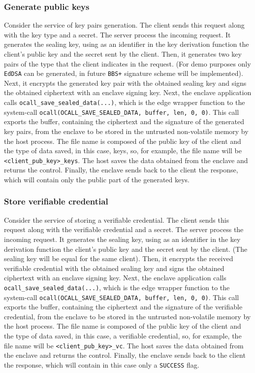 \subsubsection{Generate public keys}
Consider the service of key pairs generation. The client sends this request along with the key type and a secret. The server process the incoming request. It generates the sealing key, using as an identifier in the key derivation function the client's public key and the secret sent by the client. Then, it generates two key pairs of the type that the client indicates in the request. (For demo purposes only \texttt{EdDSA} can be generated, in future \texttt{BBS+} signature scheme will be implemented). 
Next, it encrypts the generated key pair with the obtained sealing key and signs the obtained ciphertext with an enclave signing key. Next, the enclave application calls \texttt{ocall\_save\_sealed\_data(...)}, which is the edge wrapper function to the system-call \texttt{ocall(OCALL\_SAVE\_SEALED\_DATA, buffer, len, 0, 0)}. This call exports the buffer, containing the ciphertext and the signature of the generated key pairs, from the enclave to be stored in the untrusted non-volatile memory by the host process. The file name is composed of the public key of the client and the type of data saved, in this case, keys, so, for example, the file name will be \texttt{<client\_pub\_key>\_keys}. The host saves the data obtained from the enclave and returns the control. 
Finally, the enclave sends back to the client the response, which will contain only the public part of the generated keys. 

\subsubsection{Store verifiable credential}
Consider the service of storing a verifiable credential. The client sends this request along with the verifiable credential and a secret. The server process the incoming request. It generates the sealing key, using as an identifier in the key derivation function the client's public key and the secret sent by the client. (The sealing key will be equal for the same client). Then, it encrypts the received verifiable credential with the obtained sealing key and signs the obtained ciphertext with an enclave signing key. Next, the enclave application calls \texttt{ocall\_save\_sealed\_data(...)}, which is the edge wrapper function to the system-call \texttt{ocall(OCALL\_SAVE\_SEALED\_DATA, buffer, len, 0, 0)}. This call exports the buffer, containing the ciphertext and the signature of the verifiable credential, from the enclave to be stored in the untrusted non-volatile memory by the host process. The file name is composed of the public key of the client and the type of data saved, in this case, a verifiable credential, so, for example, the file name will be \texttt{<client\_pub\_key>\_vc}. The host saves the data obtained from the enclave and returns the control. 
Finally, the enclave sends back to the client the response, which will contain in this case only a \texttt{SUCCESS} flag. \\

